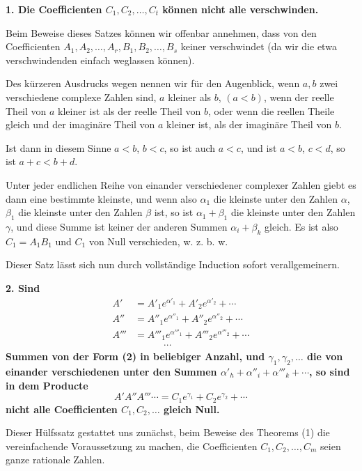 \documentclass[11pt]{article}
\begin{document}
\textbf{1. Die Coefficienten $C_1,C_2,\ldots,C_t$ können nicht alle verschwinden.}

Beim Beweise dieses Satzes können wir offenbar annehmen, dass von den Coefficienten $A_1,A_2,\ldots,A_r,B_1,B_2,\ldots,B_s$ keiner verschwindet (da wir die etwa verschwindenden einfach weglassen können).

Des kürzeren Ausdrucks wegen nennen wir für den Augenblick, wenn $a,b$ zwei verschiedene complexe Zahlen sind, $a$ kleiner als $b$, $(a<b)$, wenn der reelle Theil von $a$ kleiner ist als der reelle Theil von $b$, oder wenn die reellen Theile gleich und der imaginäre Theil von $a$ kleiner ist, als der imaginäre Theil von $b$.

Ist dann in diesem Sinne $a<b$, $b<c$, so ist auch $a<c$, und ist $a<b$, $c<d$, so ist $a+c<b+d$.

Unter jeder endlichen Reihe von einander verschiedener complexer Zahlen giebt es dann eine bestimmte kleinste, und wenn also $\alpha_1$ die kleinste unter den Zahlen $\alpha$, $\beta_1$ die kleinste unter den Zahlen $\beta$ ist, so ist $\alpha_1+\beta_1$ die kleinste unter den Zahlen $\gamma$, und diese Summe ist keiner der anderen Summen $\alpha_i+\beta_k$ gleich. Es ist also $C_1=A_1B_1$ und $C_1$ von Null verschieden, w. z. b. w.

Dieser Satz lässt sich nun durch vollständige Induction sofort verallgemeinern.

\textbf{2. Sind}
\[
\begin{aligned}
A'&=A'_1e^{\alpha'_1}+A'_2e^{\alpha'_2}+\cdots\\
A''&=A''_1e^{\alpha''_1}+A''_2e^{\alpha''_2}+\cdots\\
A'''&=A'''_1e^{\alpha'''_1}+A'''_2e^{\alpha'''_2}+\cdots\\
&\hspace{3em}\cdots
\end{aligned}
\]
\textbf{Summen von der Form (2) in beliebiger Anzahl, und $\gamma_1,\gamma_2,\ldots$ die von einander verschiedenen unter den Summen $\alpha'_h+\alpha''_i+\alpha'''_k+\cdots$, so sind in dem Producte}
\begin{equation}\tag{4}
A'A''A'''\cdots=C_1e^{\gamma_1}+C_2e^{\gamma_2}+\cdots
\end{equation}
\textbf{nicht alle Coefficienten $C_1,C_2,\ldots$ gleich Null.}

Dieser Hülfssatz gestattet uns zunächst, beim Beweise des Theorems (1) die vereinfachende Voraussetzung zu machen, die Coefficienten $C_1,C_2,\ldots,C_m$ seien ganze rationale Zahlen.
\end{document}
